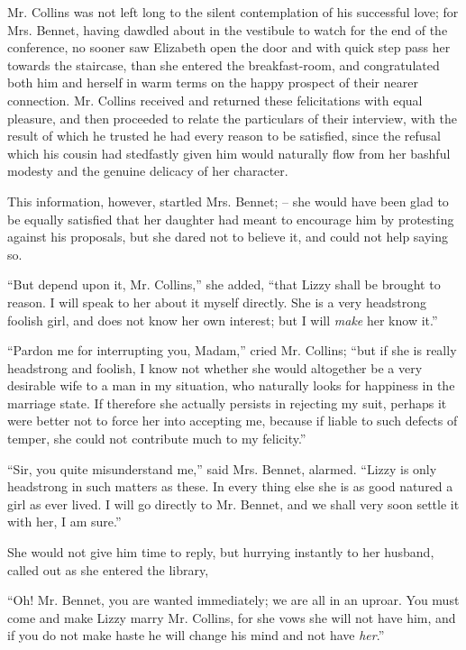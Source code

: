 Mr. Collins was not left long to the silent contemplation
of his successful love; for Mrs. Bennet, having dawdled
about in the vestibule to watch for the end of the conference,
no sooner saw Elizabeth open the door and with
quick step pass her towards the staircase, than she entered
the breakfast-room, and congratulated both him and herself
in warm terms on the happy prospect of their nearer
connection. Mr. Collins received and returned these
felicitations with equal pleasure, and then proceeded to
relate the particulars of their interview, with the result
of which he trusted he had every reason to be satisfied,
since the refusal which his cousin had stedfastly given
him would naturally flow from her bashful modesty and
the genuine delicacy of her character.

This information, however, startled Mrs. Bennet; -- she
would have been glad to be equally satisfied that her
daughter had meant to encourage him by protesting
against his proposals, but she dared not to believe it, and
could not help saying so.

“But depend upon it, Mr. Collins,” she added, “that
Lizzy shall be brought to reason. I will speak to her
about it myself directly. She is a very headstrong foolish
girl, and does not know her own interest; but I will
\textit{make} her know it.”

“Pardon me for interrupting you, Madam,” cried
Mr. Coll\-ins; “but if she is really headstrong and foolish,
I know not whether she would altogether be a very
desirable wife to a man in my situation, who naturally
looks for happiness in the marriage state. If therefore
she actually persists in rejecting my suit, perhaps it were
better not to force her into accepting me, because if liable
to such defects of temper, she could not contribute much
to my felicity.”

“Sir, you quite misunderstand me,” said Mrs. Bennet,
alarmed. “Lizzy is only headstrong in such matters as
these. In every thing else she is as good natured a girl
as ever lived. I will go directly to Mr. Bennet, and we
shall very soon settle it with her, I am sure.”

She would not give him time to reply, but hurrying
instantly to her husband, called out as she entered the
library,

“Oh! Mr. Bennet, you are wanted immediately; we
are all in an uproar. You must come and make Lizzy
marry Mr. Collins, for she vows she will not have him,
and if you do not make haste he will change his mind and
not have \textit{her}.”

